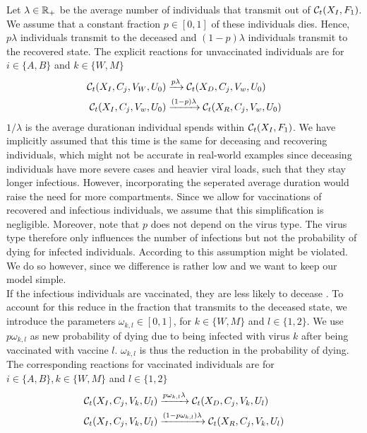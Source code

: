 Let $\lambda \in \mathbb{R}_+$ be the average number of individuals that transmit out of $\mathcal{C}_t(X_I, F_1)$. We assume that a constant fraction $p \in [0,1]$ of these individuals dies. Hence, $p\lambda$ individuals transmit to the deceased and $(1-p)\lambda$ individuals transmit to the recovered state. 
The explicit reactions for unvaccinated individuals are for $i \in \{A, B\}$ and $k \in \{W, M\}$
\begin{align}
    \mathcal{C}_t(X_I, C_j, V_W, U_0) &\xrightarrow{p \lambda} \mathcal{C}_t(X_D,C_j, V_w, U_0)  \\
    \mathcal{C}_t(X_I, C_j, V_w, U_0) &\xrightarrow{(1-p) \lambda} \mathcal{C}_t(X_R,C_j, V_w, U_0) \notag
\end{align}
$1/\lambda$ is the average durationan individual spends within $\mathcal{C}_t(X_I, F_1)$. We have implicitly assumed that this time is the same for deceasing and recovering individuals, which might not be accurate in real-world examples since deceasing individuals have more severe cases and heavier viral loads, such that they stay longer infectious. However, incorporating the seperated average duration would raise the need for more compartments. Since we allow for vaccinations of recovered and infectious individuals, we assume that this simplification is negligible. Moreover, note that $p$ does not depend on the virus type. The virus type therefore only influences the number of infections but not the probability of dying for infected individuals. According to \cite{Davies.2021} this assumption might be violated. We do so however, since we difference is rather low and we want to keep our model simple. \\


If the infectious individuals are vaccinated, they are less likely to decease \citep{Tenforde.2021, Voysey.2021}. To account for this reduce in the fraction that transmits to the deceased state, we introduce the parameters $\omega_{k,l} \in [0,1]$, for $k \in \{W, M\}$ and $l \in \{1,2\}$. We use $p \omega_{k,l}$ as new probability of dying due to being infected with virus $k$ after being vaccinated with vaccine $l$. $\omega_{k,l}$ is thus the reduction in the probability of dying. The corresponding reactions for vaccinated individuals are for $i \in \{A, B\}, k \in \{W, M\}$ and $l \in \{1,2\}$
\begin{align}
    \mathcal{C}_t(X_I, C_j, V_k, U_l) &\xrightarrow{p \omega_{k,l} \lambda} \mathcal{C}_t(X_D,C_j, V_k, U_l) \\
    \mathcal{C}_t(X_I, C_j, V_k, U_l) &\xrightarrow{(1-p \omega_{k,l}) \lambda} \mathcal{C}_t(X_R,C_j, V_k, U_l) \notag
\end{align}

